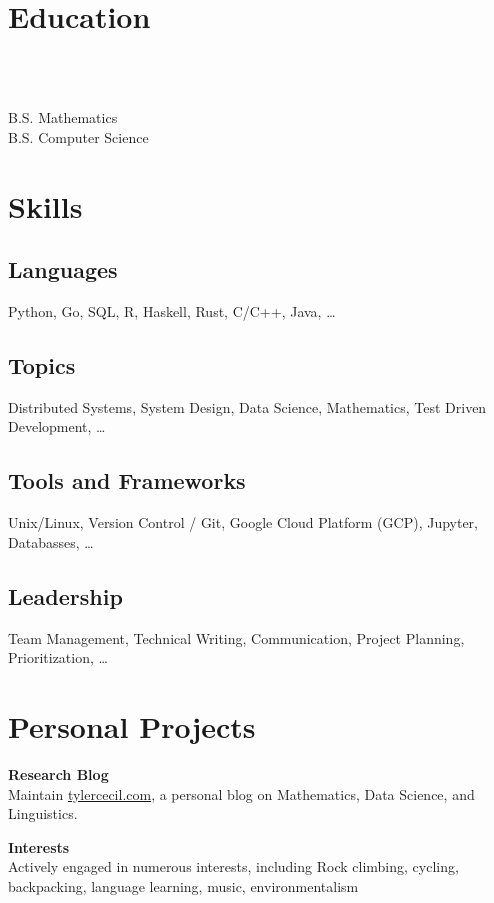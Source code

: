 \documentclass{tc_cv}
\begin{document}

\begin{minipage}[t]{0.3\linewidth}

  \vspace{2em}
  \section{Education}
  \\
  \date{Fall 2011 --- Spring 2016}\\
  \faGraduationCap \hspace{1ex} B.S. Mathematics\\
  \faGraduationCap \hspace{1ex} B.S. Computer Science

  \vspace{2em}
  \section{Skills}
  \subsection{Languages}
  Python,
  Go,
  SQL,
  R,
  Haskell,
  Rust,
  C/C++,
  Java,
  \ldots

  \subsection{Topics}
  Distributed Systems,
  System Design,
  Data Science,
  Mathematics,
  Test Driven Development,
  \ldots

  \subsection{Tools and Frameworks}
  Unix/Linux,
  Version Control / Git,
  Google Cloud Platform (GCP),
  Jupyter,
  Databasses,
  \ldots

  \subsection{Leadership}
  Team Management,
  Technical Writing,
  Communication,
  Project Planning,
  Prioritization,
  \ldots

  \vspace{2em}
  \section{Personal Projects}
  \textbf{Research Blog}\\
  Maintain \href{https://tylercecil.com}{tylercecil.com}, a personal blog on
  Mathematics, Data Science, and Linguistics.

  \textbf{Interests}\\
  Actively engaged in numerous interests, including
  Rock climbing, cycling, backpacking, language learning, music,
  environmentalism

\end{minipage}
\end{document}
